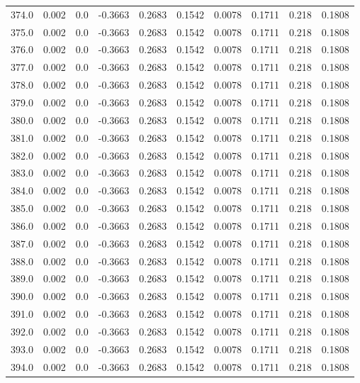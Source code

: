 \begin{longtable}{lrrrrrrrrr}
374.0 & 0.002 & 0.0 & -0.3663 & 0.2683 & 0.1542 & 0.0078 & 0.1711 & 0.218 & 0.1808 \\
375.0 & 0.002 & 0.0 & -0.3663 & 0.2683 & 0.1542 & 0.0078 & 0.1711 & 0.218 & 0.1808 \\
376.0 & 0.002 & 0.0 & -0.3663 & 0.2683 & 0.1542 & 0.0078 & 0.1711 & 0.218 & 0.1808 \\
377.0 & 0.002 & 0.0 & -0.3663 & 0.2683 & 0.1542 & 0.0078 & 0.1711 & 0.218 & 0.1808 \\
378.0 & 0.002 & 0.0 & -0.3663 & 0.2683 & 0.1542 & 0.0078 & 0.1711 & 0.218 & 0.1808 \\
379.0 & 0.002 & 0.0 & -0.3663 & 0.2683 & 0.1542 & 0.0078 & 0.1711 & 0.218 & 0.1808 \\
380.0 & 0.002 & 0.0 & -0.3663 & 0.2683 & 0.1542 & 0.0078 & 0.1711 & 0.218 & 0.1808 \\
381.0 & 0.002 & 0.0 & -0.3663 & 0.2683 & 0.1542 & 0.0078 & 0.1711 & 0.218 & 0.1808 \\
382.0 & 0.002 & 0.0 & -0.3663 & 0.2683 & 0.1542 & 0.0078 & 0.1711 & 0.218 & 0.1808 \\
383.0 & 0.002 & 0.0 & -0.3663 & 0.2683 & 0.1542 & 0.0078 & 0.1711 & 0.218 & 0.1808 \\
384.0 & 0.002 & 0.0 & -0.3663 & 0.2683 & 0.1542 & 0.0078 & 0.1711 & 0.218 & 0.1808 \\
385.0 & 0.002 & 0.0 & -0.3663 & 0.2683 & 0.1542 & 0.0078 & 0.1711 & 0.218 & 0.1808 \\
386.0 & 0.002 & 0.0 & -0.3663 & 0.2683 & 0.1542 & 0.0078 & 0.1711 & 0.218 & 0.1808 \\
387.0 & 0.002 & 0.0 & -0.3663 & 0.2683 & 0.1542 & 0.0078 & 0.1711 & 0.218 & 0.1808 \\
388.0 & 0.002 & 0.0 & -0.3663 & 0.2683 & 0.1542 & 0.0078 & 0.1711 & 0.218 & 0.1808 \\
389.0 & 0.002 & 0.0 & -0.3663 & 0.2683 & 0.1542 & 0.0078 & 0.1711 & 0.218 & 0.1808 \\
390.0 & 0.002 & 0.0 & -0.3663 & 0.2683 & 0.1542 & 0.0078 & 0.1711 & 0.218 & 0.1808 \\
391.0 & 0.002 & 0.0 & -0.3663 & 0.2683 & 0.1542 & 0.0078 & 0.1711 & 0.218 & 0.1808 \\
392.0 & 0.002 & 0.0 & -0.3663 & 0.2683 & 0.1542 & 0.0078 & 0.1711 & 0.218 & 0.1808 \\
393.0 & 0.002 & 0.0 & -0.3663 & 0.2683 & 0.1542 & 0.0078 & 0.1711 & 0.218 & 0.1808 \\
394.0 & 0.002 & 0.0 & -0.3663 & 0.2683 & 0.1542 & 0.0078 & 0.1711 & 0.218 & 0.1808 \\

\end{longtable}
